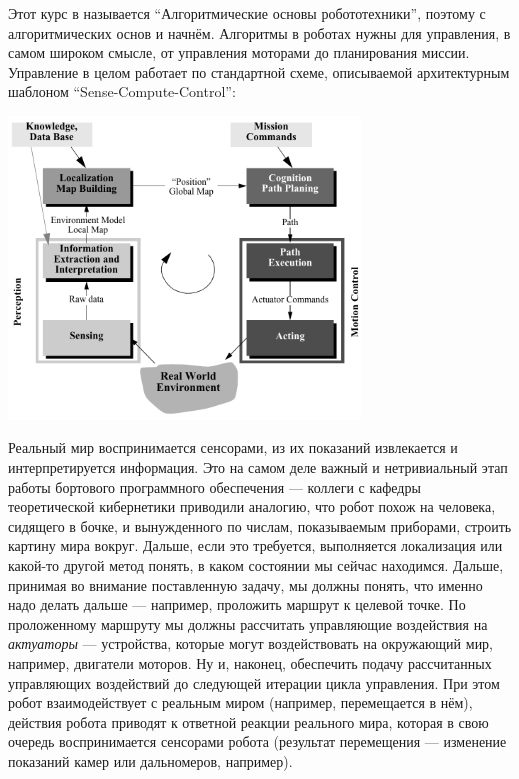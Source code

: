 \documentclass{../../text-style}
\begin{document}
Этот курс в называется \enquote{Алгоритмические основы робототехники}, поэтому с алгоритмических основ и начнём.
Алгоритмы в роботах нужны для управления, в самом широком смысле, от управления моторами до планирования миссии.
Управление в целом работает по стандартной схеме, описываемой архитектурным шаблоном \enquote{Sense-Compute-Control}:

\begin{center}
    \includegraphics[width=0.7\textwidth]{controlLoop.png}
\end{center}

Реальный мир воспринимается сенсорами, из их показаний извлекается и интерпретируется информация.
Это на самом деле важный и нетривиальный этап работы бортового программного обеспечения --- коллеги с кафедры теоретической кибернетики приводили аналогию, что робот похож на человека, сидящего в бочке, и вынужденного по числам, показываемым приборами, строить картину мира вокруг.
Дальше, если это требуется, выполняется локализация или какой-то другой метод понять, в каком состоянии мы сейчас находимся.
Дальше, принимая во внимание поставленную задачу, мы должны понять, что именно надо делать дальше --- например, проложить маршрут к целевой точке.
По проложенному маршруту мы должны рассчитать управляющие воздействия на \emph{актуаторы} --- устройства, которые могут воздействовать на окружающий мир, например, двигатели моторов.
Ну и, наконец, обеспечить подачу рассчитанных управляющих воздействий до следующей итерации цикла управления.
При этом робот взаимодействует с реальным миром (например, перемещается в нём), действия робота приводят к ответной реакции реального мира, которая в свою очередь воспринимается сенсорами робота (результат перемещения --- изменение показаний камер или дальномеров, например).
\end{document}
